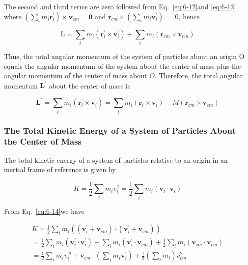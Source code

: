 \documentclass[10pt]{article}
\numberwithin{equation}{section}
\begin{document}
The second and third terms are zero followed from Eq.~\eqref{eq:6-12}and \eqref{eq:6-13} where $\left(\sum_{i} m_{i} \mathbf{r}_{i}^{\prime}\right) \times \mathbf{v}_{c m}=\mathbf{0}$ and $\mathbf{r}_{c m} \times\left(\sum_{i} m_{i} \mathbf{v}_{i}^{\prime}\right)=$ 0, hence

$$
\mathrm{L}=\sum_{i} m_{i}\left(\mathbf{r}_{i}^{\prime} \times \mathbf{v}_{i}^{\prime}\right)+\sum_{i} m_{i}\left(\mathbf{r}_{c m} \times \mathbf{v}_{c m}\right)
$$

Thus, the total angular momentum of the system of particles about an origin O equals the angular momentum of the system about the center of mass plus the angular momentum of the center of mass about $O$. Therefore, the total angular momentum $\mathbf{L}^{\prime}$ about the center of mass is


\begin{equation}
\mathbf{L}^{\prime}=\sum_{i} m_{i}\left(\mathbf{r}_{i}^{\prime} \times \mathbf{v}_{i}^{\prime}\right)=\sum_{i} m_{i}\left(\mathbf{r}_{i} \times \mathbf{v}_{i}\right)-M\left(\mathbf{r}_{c m} \times \mathbf{v}_{c m}\right) \label{eq:6-15}
\end{equation}


\subsubsection{The Total Kinetic Energy of a System of Particles About the Center of Mass}\label{sec:6-4-3}
The total kinetic energy of a system of particles relative to an origin in an inertial frame of reference is given by

$$
K=\frac{1}{2} \sum_{i} m_{i} v_{i}^{2}=\frac{1}{2} \sum_{i} m_{i}\left(\mathbf{v}_{i} \cdot \mathbf{v}_{i}\right)
$$

From Eq.~\eqref{eq:6-14}we have

$$
\begin{gathered}
K=\frac{1}{2} \sum_{i} m_{i}\left(\left(\mathbf{v}_{i}^{\prime}+\mathbf{v}_{c m}\right) \cdot\left(\mathbf{v}_{i}^{\prime}+\mathbf{v}_{c m}\right)\right) \\
=\frac{1}{2} \sum_{i} m_{i}\left(\mathbf{v}_{i}^{\prime} \cdot \mathbf{v}_{i}^{\prime}\right)+\sum_{i} m_{i}\left(\mathbf{v}_{i}^{\prime} \cdot \mathbf{v}_{c m}\right)+\frac{1}{2} \sum_{i} m_{i}\left(\mathbf{v}_{c m} \cdot \mathbf{v}_{c m}\right) \\
=\frac{1}{2} \sum_{i} m_{i} v_{i}^{\prime 2}+\mathbf{v}_{c m} \cdot\left(\sum_{i} m_{i} \mathbf{v}_{i}^{\prime}\right)+\frac{1}{2}\left(\sum_{i} m_{i}\right) v_{c m}^{2}
\end{gathered}
$$
\end{document}
